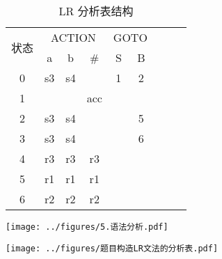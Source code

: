 \begin{table}[H]
    \centering
    \caption{LR 分析表结构}
    \label{table:LR 分析表结构}
    \setlength{\tabcolsep}{4mm}
    \begin{tabular}{|c|c|c|c|c|c|c|c|c|}
        \hline
        \multirow{2}{*}{状态} & \multicolumn{3}{c|}{ACTION} & \multicolumn{2}{c|}{GOTO}               \\ \cline{2-6}
                              & a                           & b                         & \#  & S & B \\ \hline
        0                     & s3                          & s4                        &     & 1 & 2 \\ \hline
        1                     &                             &                           & acc &   &   \\ \hline
        2                     & s3                          & s4                        &     &   & 5 \\ \hline
        3                     & s3                          & s4                        &     &   & 6 \\ \hline
        4                     & r3                          & r3                        & r3  &   &   \\ \hline
        5                     & r1                          & r1                        & r1  &   &   \\ \hline
        6                     & r2                          & r2                        & r2  &   &   \\
        \hline
    \end{tabular}
\end{table}

\texttt{[image: ../figures/5.语法分析.pdf]}


\texttt{[image: ../figures/题目构造LR文法的分析表.pdf]}


\newpage